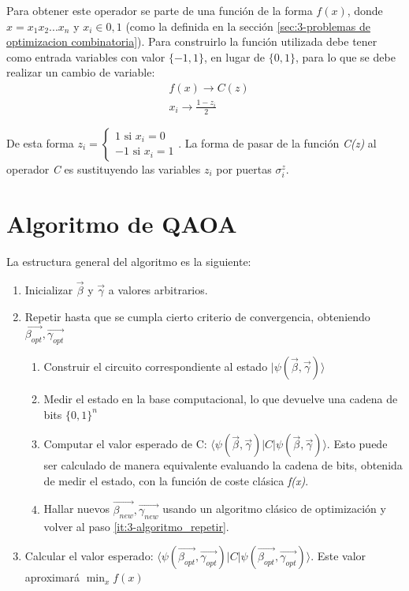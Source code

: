 \documentclass{article}
\begin{document}
Para obtener este operador se parte de una función de la forma \(f(x)\), donde \(x=x_1x_2...x_n\) y \(x_i\in{0, 1}\) (como la definida en la sección \ref{sec:3-problemas de optimizacion combinatoria}). Para construirlo la función utilizada debe tener como entrada variables con valor \(\{-1, 1\}\), en lugar de \(\{0, 1\}\), para lo que se debe realizar un cambio de variable:
\begin{align*}
  &f(x) \rightarrow C(z) \\
  &x_i \rightarrow \frac{1 - z_i}{2}
\end{align*}

De esta forma \(z_i = \begin{cases}
  1 \text{ si } x_i = 0 \\
  -1 \text{ si } x_i = 1
\end{cases}\).
La forma de pasar de la función \textit{C(z)} al operador \textit{C} es sustituyendo las variables \(z_i\) por puertas \(\sigma^z_i\).

\section{Algoritmo de QAOA}
La estructura general del algoritmo es la siguiente:
\begin{enumerate}
\item Inicializar \(\vec{\beta}\) y \(\vec{\gamma}\) a valores arbitrarios.
\item Repetir hasta que se cumpla cierto criterio de convergencia, obteniendo \(\vec{\beta_{opt}}, \vec{\gamma_{opt}}\)
  \label{it:3-algoritmo_repetir}
  \begin{enumerate}
  \item Construir el circuito correspondiente al estado \(\lvert\psi(\vec{\beta}, \vec{\gamma})\rangle\)
  \item Medir el estado en la base computacional, lo que devuelve una cadena de bits \(\{0, 1\}^n\)
  \item Computar el valor esperado de C: \( \langle \psi(\vec{\beta}, \vec{\gamma}) \rvert C \lvert \psi(\vec{\beta}, \vec{\gamma}) \rangle \).
    Esto puede ser calculado de manera equivalente evaluando la cadena de bits, obtenida de medir el estado, con la función de coste clásica \textit{f(x)}.
  \item Hallar nuevos \(\vec{\beta_{new}}, \vec{\gamma_{new}}\) usando un algoritmo clásico de optimización y volver al paso \ref{it:3-algoritmo_repetir}.
  \end{enumerate}
\item Calcular el valor esperado: \( \langle \psi(\vec{\beta_{opt}}, \vec{\gamma_{opt}}) \rvert C \lvert \psi(\vec{\beta_{opt}}, \vec{\gamma_{opt}}) \rangle \). Este valor aproximará \(\min_{x}f(x)\)
\end{enumerate}
\end{document}
